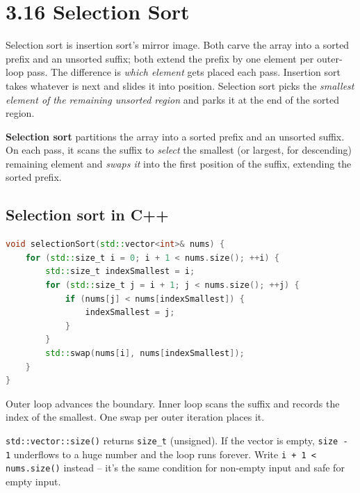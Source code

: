 \documentclass[11pt]{article}
\begin{document}
\section{3.16 Selection Sort}

Selection sort is insertion sort's mirror image. Both carve the
array into a sorted prefix and an unsorted suffix; both extend the
prefix by one element per outer-loop pass. The difference is
\emph{which element} gets placed each pass. Insertion sort takes
whatever is next and slides it into position. Selection sort picks
the \emph{smallest element of the remaining unsorted region} and
parks it at the end of the sorted region.

\begin{defnbox}
\textbf{Selection sort} partitions the array into a sorted prefix
and an unsorted suffix. On each pass, it scans the suffix to
\emph{select} the smallest (or largest, for descending) remaining
element and \emph{swaps it} into the first position of the suffix,
extending the sorted prefix.
\end{defnbox}

\subsection{Selection sort in C++}

\begin{examplebox}
\begin{lstlisting}[basicstyle=\ttfamily\small,frame=single,language=C++]
void selectionSort(std::vector<int>& nums) {
    for (std::size_t i = 0; i + 1 < nums.size(); ++i) {
        std::size_t indexSmallest = i;
        for (std::size_t j = i + 1; j < nums.size(); ++j) {
            if (nums[j] < nums[indexSmallest]) {
                indexSmallest = j;
            }
        }
        std::swap(nums[i], nums[indexSmallest]);
    }
}
\end{lstlisting}
Outer loop advances the boundary. Inner loop scans the suffix and
records the index of the smallest. One swap per outer iteration
places it.
\end{examplebox}

\begin{warnbox}
\texttt{std::vector::size()} returns \texttt{size\_t} (unsigned). If
the vector is empty, \texttt{size - 1} underflows to a huge number
and the loop runs forever. Write \texttt{i + 1 < nums.size()}
instead -- it's the same condition for non-empty input and safe for
empty input.
\end{warnbox}
\end{document}
